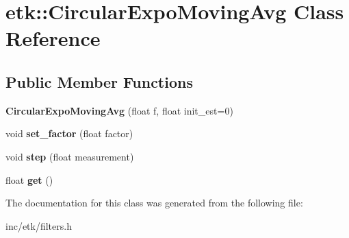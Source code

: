 \hypertarget{classetk_1_1_circular_expo_moving_avg}{\section{etk\-:\-:Circular\-Expo\-Moving\-Avg Class Reference}
\label{classetk_1_1_circular_expo_moving_avg}
}
\subsection*{Public Member Functions}
\begin{DoxyCompactItemize}
\item 
\hypertarget{classetk_1_1_circular_expo_moving_avg_af0293c8c47a8d1a3c97d99a1301ad84f}{{\bfseries Circular\-Expo\-Moving\-Avg} (float f, float init\-\_\-est=0)}\label{classetk_1_1_circular_expo_moving_avg_af0293c8c47a8d1a3c97d99a1301ad84f}

\item 
\hypertarget{classetk_1_1_circular_expo_moving_avg_a5184141ce21a3aebfe2d2de3a12c62e0}{void {\bfseries set\-\_\-factor} (float factor)}\label{classetk_1_1_circular_expo_moving_avg_a5184141ce21a3aebfe2d2de3a12c62e0}

\item 
\hypertarget{classetk_1_1_circular_expo_moving_avg_a1567ffe88e1d791fb6de8ede2dd88e64}{void {\bfseries step} (float measurement)}\label{classetk_1_1_circular_expo_moving_avg_a1567ffe88e1d791fb6de8ede2dd88e64}

\item 
\hypertarget{classetk_1_1_circular_expo_moving_avg_acd18598fb0148f5737902a7c58db584f}{float {\bfseries get} ()}\label{classetk_1_1_circular_expo_moving_avg_acd18598fb0148f5737902a7c58db584f}

\end{DoxyCompactItemize}


The documentation for this class was generated from the following file\-:\begin{DoxyCompactItemize}
\item 
inc/etk/filters.\-h\end{DoxyCompactItemize}
